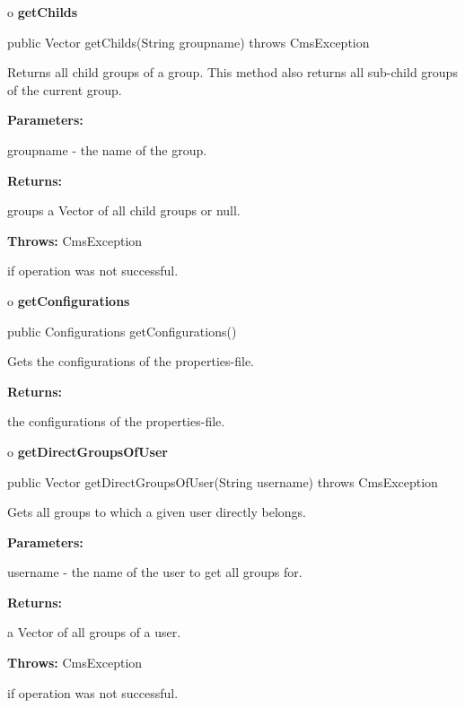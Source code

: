 o {\bf getChilds}

\begin{PRE}
 public Vector getChilds(String groupname) throws CmsException
\end{PRE}

\begin{description}
\htmlDD Returns all child groups of a group. \htmlBR
This method also returns all sub-child groups of the current group.

\begin{description}
\item {\bf Parameters:}

groupname - the name of the group.
\item {\bf Returns:}

groups a Vector of all child groups or null.
\item {\bf Throws:} CmsException

if operation was not successful.
\end{description}

\end{description}

o {\bf getConfigurations}

\begin{PRE}
 public Configurations getConfigurations()
\end{PRE}

\begin{description}
\htmlDD Gets the configurations of the properties-file.

\begin{description}
\item {\bf Returns:}

the configurations of the properties-file.
\end{description}

\end{description}

o {\bf getDirectGroupsOfUser}

\begin{PRE}
 public Vector getDirectGroupsOfUser(String username) throws CmsException
\end{PRE}

\begin{description}
\htmlDD Gets all groups to which a given user directly belongs.

\begin{description}
\item {\bf Parameters:}

username - the name of the user to get all groups for.
\item {\bf Returns:}

a Vector of all groups of a user.
\item {\bf Throws:} CmsException

if operation was not successful.
\end{description}

\end{description}

